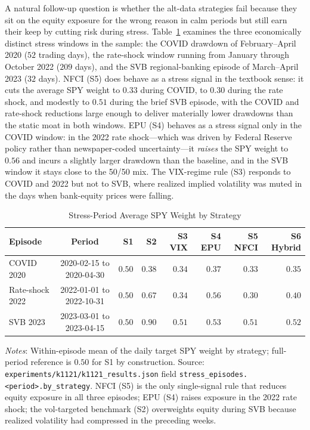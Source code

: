 \documentclass[12pt,a4paper]{article}
\begin{document}
A natural follow-up question is whether the alt-data strategies fail because they sit on the equity exposure for the wrong reason in calm periods but still earn their keep by cutting risk during stress. Table~\ref{tab:k1121_stress} examines the three economically distinct stress windows in the sample: the COVID drawdown of February--April 2020 ($52$ trading days), the rate-shock window running from January through October 2022 ($209$ days), and the SVB regional-banking episode of March--April 2023 ($32$ days). NFCI (S5) does behave as a stress signal in the textbook sense: it cuts the average SPY weight to $0.33$ during COVID, to $0.30$ during the rate shock, and modestly to $0.51$ during the brief SVB episode, with the COVID and rate-shock reductions large enough to deliver materially lower drawdowns than the static moat in both windows. EPU (S4) behaves as a stress signal only in the COVID window: in the 2022 rate shock---which was driven by Federal Reserve policy rather than newspaper-coded uncertainty---it \emph{raises} the SPY weight to $0.56$ and incurs a slightly larger drawdown than the baseline, and in the SVB window it stays close to the 50/50 mix. The VIX-regime rule (S3) responds to COVID and 2022 but not to SVB, where realized implied volatility was muted in the days when bank-equity prices were falling.

\begin{table}[H]
\centering
\small
\begin{threeparttable}
\caption{Stress-Period Average SPY Weight by Strategy}
\label{tab:k1121_stress}
\begin{tabular}{@{}lcrrrrrr@{}}
\toprule
Episode & Period & S1 & S2 & S3 VIX & S4 EPU & S5 NFCI & S6 Hybrid \\
\midrule
COVID 2020          & 2020-02-15 to 2020-04-30 & $0.50$ & $0.38$ & $0.34$ & $0.37$ & $\mathbf{0.33}$ & $0.35$ \\
Rate-shock 2022     & 2022-01-01 to 2022-10-31 & $0.50$ & $0.67$ & $0.34$ & $0.56$ & $\mathbf{0.30}$ & $0.40$ \\
SVB 2023            & 2023-03-01 to 2023-04-15 & $0.50$ & $0.90$ & $0.51$ & $0.53$ & $0.51$ & $0.52$ \\
\bottomrule
\end{tabular}
\begin{tablenotes}
\small
\item \textit{Notes}: Within-episode mean of the daily target SPY weight by strategy; full-period reference is $0.50$ for S1 by construction. Source: \texttt{experiments/k1121/k1121\_results.json} field \texttt{stress\_episodes.<period>.by\_strategy}. NFCI (S5) is the only single-signal rule that reduces equity exposure in all three episodes; EPU (S4) raises exposure in the 2022 rate shock; the vol-targeted benchmark (S2) overweights equity during SVB because realized volatility had compressed in the preceding weeks.
\end{tablenotes}
\end{threeparttable}
\end{table}
\end{document}
